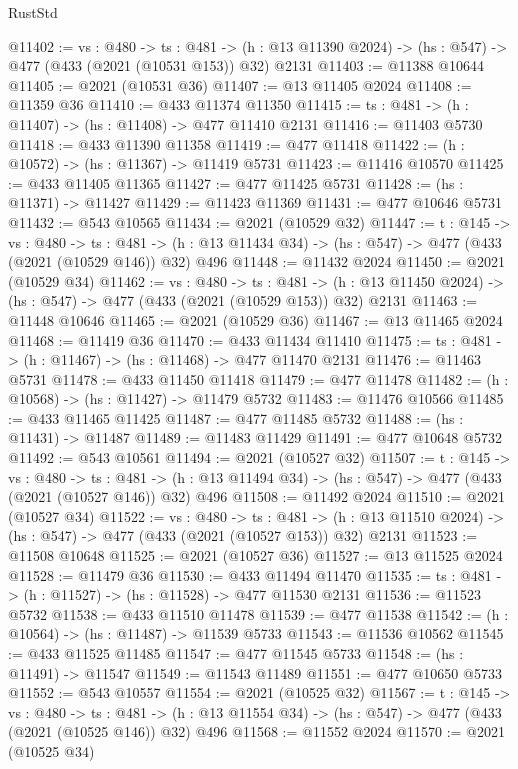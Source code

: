 \begin{lexlean}{RustStd}
\begin{coremodule}
@11402 := {vs : @480} ->
  {ts : @481} ->
  (h : @13 @11390 @2024) -> (hs : @547) -> @477 (@433 (@2021 (@10531 @153)) @32) @2131
@11403 := @11388 @10644
@11405 := @2021 (@10531 @36)
@11407 := @13 @11405 @2024
@11408 := @11359 @36
@11410 := @433 @11374 @11350
@11415 := {ts : @481} -> (h : @11407) -> (hs : @11408) -> @477 @11410 @2131
@11416 := @11403 @5730
@11418 := @433 @11390 @11358
@11419 := @477 @11418
@11422 := (h : @10572) -> (hs : @11367) -> @11419 @5731
@11423 := @11416 @10570
@11425 := @433 @11405 @11365
@11427 := @477 @11425 @5731
@11428 := (hs : @11371) -> @11427
@11429 := @11423 @11369
@11431 := @477 @10646 @5731
@11432 := @543 @10565
@11434 := @2021 (@10529 @32)
@11447 := {t : @145} ->
  {vs : @480} ->
  {ts : @481} -> (h : @13 @11434 @34) -> (hs : @547) -> @477 (@433 (@2021 (@10529 @146)) @32) @496
@11448 := @11432 @2024
@11450 := @2021 (@10529 @34)
@11462 := {vs : @480} ->
  {ts : @481} ->
  (h : @13 @11450 @2024) -> (hs : @547) -> @477 (@433 (@2021 (@10529 @153)) @32) @2131
@11463 := @11448 @10646
@11465 := @2021 (@10529 @36)
@11467 := @13 @11465 @2024
@11468 := @11419 @36
@11470 := @433 @11434 @11410
@11475 := {ts : @481} -> (h : @11467) -> (hs : @11468) -> @477 @11470 @2131
@11476 := @11463 @5731
@11478 := @433 @11450 @11418
@11479 := @477 @11478
@11482 := (h : @10568) -> (hs : @11427) -> @11479 @5732
@11483 := @11476 @10566
@11485 := @433 @11465 @11425
@11487 := @477 @11485 @5732
@11488 := (hs : @11431) -> @11487
@11489 := @11483 @11429
@11491 := @477 @10648 @5732
@11492 := @543 @10561
@11494 := @2021 (@10527 @32)
@11507 := {t : @145} ->
  {vs : @480} ->
  {ts : @481} -> (h : @13 @11494 @34) -> (hs : @547) -> @477 (@433 (@2021 (@10527 @146)) @32) @496
@11508 := @11492 @2024
@11510 := @2021 (@10527 @34)
@11522 := {vs : @480} ->
  {ts : @481} ->
  (h : @13 @11510 @2024) -> (hs : @547) -> @477 (@433 (@2021 (@10527 @153)) @32) @2131
@11523 := @11508 @10648
@11525 := @2021 (@10527 @36)
@11527 := @13 @11525 @2024
@11528 := @11479 @36
@11530 := @433 @11494 @11470
@11535 := {ts : @481} -> (h : @11527) -> (hs : @11528) -> @477 @11530 @2131
@11536 := @11523 @5732
@11538 := @433 @11510 @11478
@11539 := @477 @11538
@11542 := (h : @10564) -> (hs : @11487) -> @11539 @5733
@11543 := @11536 @10562
@11545 := @433 @11525 @11485
@11547 := @477 @11545 @5733
@11548 := (hs : @11491) -> @11547
@11549 := @11543 @11489
@11551 := @477 @10650 @5733
@11552 := @543 @10557
@11554 := @2021 (@10525 @32)
@11567 := {t : @145} ->
  {vs : @480} ->
  {ts : @481} -> (h : @13 @11554 @34) -> (hs : @547) -> @477 (@433 (@2021 (@10525 @146)) @32) @496
@11568 := @11552 @2024
@11570 := @2021 (@10525 @34)

\end{coremodule}
\end{lexlean}
